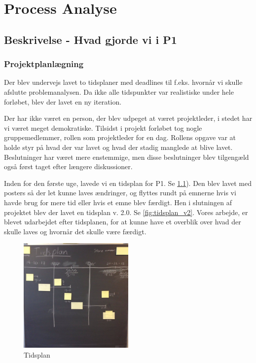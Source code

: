 \documentclass[a4paper,12pt,oneside,article]{memoir}
\begin{document}
\chapter{Process Analyse}

    \section{Beskrivelse - Hvad gjorde vi i P1} 

        \subsection{Projektplanlægning}

        Der blev undervejs lavet to tidsplaner med deadlines til f.eks. hvornår vi skulle afslutte problemanalysen. Da ikke alle tidspunkter var realistiske under hele forløbet, blev der lavet en ny iteration.
  
        Der har ikke været en person, der blev udpeget at været projektleder, i stedet har vi været meget demokratiske. Tilsidst i projekt forløbet tog nogle gruppemedlemmer, rollen som projektleder for en dag. Rollens opgave var at holde styr på hvad der var lavet og hvad der stadig manglede at blive lavet. Beslutninger har været mere enstemmige, men disse beslutninger blev tilgengæld også først taget efter længere diskussioner.


            
            Inden for den første uge, lavede vi en tidsplan for P1. Se \cref{fig:tidsplan}). Den blev lavet med posters så der let kunne laves ændringer, og flyttes rundt på emnerne hvis vi havde brug for mere tid eller hvis et emne blev færdigt. Hen i slutningen af projektet blev der lavet en tidsplan v. 2.0. Se \cref{fig:tidsplan_v2}. Vores arbejde, er blevet udarbejdet  efter tidsplanen, for at kunne have et overblik over hvad der skulle laves og hvornår det skulle være færdigt.

            \begin{figure}[ht!]
                \centering
                \includegraphics[width=0.5\textwidth]{Images/9.jpg}
                \caption{Tidsplan}
                \label{fig:tidsplan}
            \end{figure}
\end{document}
